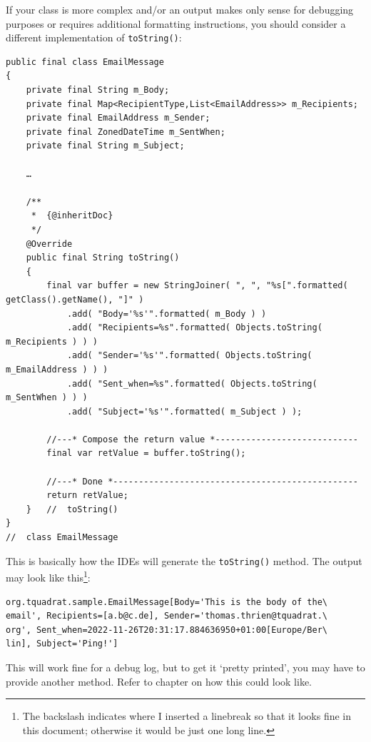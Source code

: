 If your class is more complex and/or an output makes only sense for debugging purposes or requires additional formatting instructions, you should consider a different implementation of \lstinline|toString()|:
\begin{lstlisting}
public final class EmailMessage
{
    private final String m_Body;
    private final Map<RecipientType,List<EmailAddress>> m_Recipients;
    private final EmailAddress m_Sender;
    private final ZonedDateTime m_SentWhen;
    private final String m_Subject;
    
    …
    
    /**
     *  {@inheritDoc}
     */
    @Override 
    public final String toString()
    {
        final var buffer = new StringJoiner( ", ", "%s[".formatted( getClass().getName(), "]" )
            .add( "Body='%s'".formatted( m_Body ) )
            .add( "Recipients=%s".formatted( Objects.toString( m_Recipients ) ) )
            .add( "Sender='%s'".formatted( Objects.toString( m_EmailAddress ) ) )
            .add( "Sent_when=%s".formatted( Objects.toString( m_SentWhen ) ) )
            .add( "Subject='%s'".formatted( m_Subject ) );
            
        //---* Compose the return value *----------------------------    
        final var retValue = buffer.toString();
        
        //---* Done *------------------------------------------------
        return retValue;
    }   //  toString()
}
//  class EmailMessage
\end{lstlisting}

This is basically how the IDEs will generate the \lstinline|toString()| method. The output may look like this\footnote{The backslash indicates where I inserted a linebreak so that it looks fine in this document; otherwise it would be just one long line.}:
\begin{verbatim}
org.tquadrat.sample.EmailMessage[Body='This is the body of the\
email', Recipients=[a.b@c.de], Sender='thomas.thrien@tquadrat.\
org', Sent_when=2022-11-26T20:31:17.884636950+01:00[Europe/Ber\
lin], Subject='Ping!']
\end{verbatim}

This will work fine for a debug log, but to get it ‘pretty printed’, you may have to provide another method. Refer to chapter  on how
this could look like.

